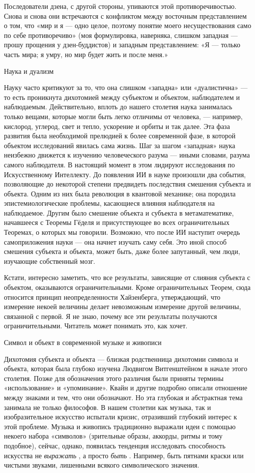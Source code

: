 Последователи дзена, с другой стороны, упиваются этой противоречивостью. Снова и снова они встречаются с конфликтом между восточным представлением о том, что «мир и я --- одно целое, поэтому понятие моего несуществования само по себе противоречиво» (моя формулировка, наверняка, слишком западная --- прошу прощения у дзен-буддистов) и западным представлением: «Я --- только часть мира; я умру, но мир будет жить и после меня.»

Наука и дуализм

Науку часто критикуют за то, что она слишком «западна» или «дуалистична» --- то есть проникнута дихотомией между субъектом и объектом, наблюдателем и наблюдаемым. Действительно, вплоть до нашего столетия наука занималась только вещами, которые могли быть легко отличимы от человека, --- например, кислород, углерод, свет и тепло, ускорение и орбиты и так далее. Эта фаза развития была необходимой прелюдией к более современной фазе, в которой объектом исследований явилась сама жизнь. Шаг за шагом «западная» наука неизбежно движется к изучению человеческого разума --- иными словами, разума самого наблюдателя. В настоящий момент в этом лидируют исследования по Искусственному Интеллекту. До появления ИИ в науке произошли два события, позволяющие до некоторой степени предвидеть последствия смешения субъекта и объекта. Одним из них была революция в квантовой механике; она породила эпистемиологические проблемы, касающиеся влияния наблюдателя на наблюдаемое. Другим было смешение объекта и субъекта в метаматематике, начавшееся с Теоремы Гёделя и присутствующее во всех ограничительных Теоремах, о которых мы говорили. Возможно, что после ИИ наступит очередь самоприложения науки --- она начнет изучать саму себя. Это иной способ смешения субъекта и объекта, может быть, даже более запутанный, чем люди, изучающие собственный мозг.

Кстати, интересно заметить, что все результаты, зависящие от слияния субъекта с объектом, оказываются ограничительными. Кроме ограничительных Теорем, сюда относится принцип неопределенности Хайзенберга, утверждающий, что измерение некоей величины делает невозможным измерение другой величины, связанной с первой. Я не знаю, почему все эти результаты получаются ограничительными. Читатель может понимать это, как хочет.

Символ и объект в современной музыке и живописи

Дихотомия субъекта и объекта --- близкая родственница дихотомии символа и объекта, которая была глубоко изучена Людвигом Витгенштейном в начале этого столетия. Позже для обозначения этого различия были приняты термины «использование» и «упоминание». Квайн и другие подробно описали отношение между знаками и тем, что они обозначают. Но эта глубокая и абстрактная тема занимала не только философов. В нашем столетии как музыка, так и изобразительное искусство испытали кризис, отразивший глубокий интерес к этой проблеме. Музыка и живопись традиционно выражали идеи с помощью некоего набора «символов» (зрительные образы, аккорды, ритмы и тому подобное), сейчас, однако, появилась тенденция исследовать способность искусства не \emph{выражать} , а просто \emph{быть} . Например, быть пятнами краски или чистыми звуками, лишенными всякого символического значения.

